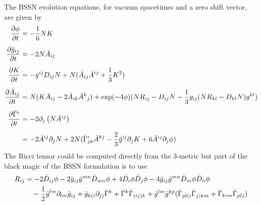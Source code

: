 \documentclass[a4paper,12pt]{article}
\numberwithin{equation}{section}%
\begin{document}
The BSSN evolution equations, for vacuum spacetimes and a zero shift vector, are given by
\begin{align}
   \ddt{\phi} &= -\frac{1}{6} N \trK\label{eqn:bssn01}\\[5pt]       %
%
   \ddt{\gBar_{ij}} &= -2 N \ABar_{i j}\label{eqn:bssn02}\\[5pt]    %
%
   \ddt{\trK} &= - g^{i j} D_{i j}{N}
                 + N (\ABar_{i j} \ABar^{i j} + \frac{1}{3} \trK^2)\label{eqn:bssn03}\\[5pt]     %
   \ddt{\ABar_{ij}} &= N (\trK \ABar_{i j} - 2 \ABar_{i k} \ABar^{k}{}_{j})
                       + \exp(-4\phi) (N R_{i j} - D_{i j}{N}
                                       - \frac{1}{3} g_{i j} (N R_{k l}
                                                              - D_{k l}{N}) g^{k l})
                                                                   \label{eqn:bssn04}\\[5pt]
   \ddt{\GammaBar^i} &= - 2 \partial_{j}\left(N \ABar^{i j}\right)\label{eqn:bssn05}\\[5pt]      %
                     &= - 2 \ABar^{i j} \partial_{j}{N}
                        + 2 N (  \GammaBar^{i}_{j k} \ABar^{k j}
                               - \frac{2}{3} \gBar^{i j} \partial_{j}{\trK}
                               + 6 \ABar^{i j} \partial_{j}{\phi})\label{eqn:bssn06}             %
\end{align}
The Ricci tensor could be computed directly from the 3-metric but part of the black magic of
the BSSN formulation is to use
\begin{align}
   R_{ij} &= - 2 {\bar{D}}_{i j}{\phi}
             - 2 {\bar{g}}_{i j} {\bar{g}}^{m n} {\bar{D}}_{m n}{\phi}
             + 4 {\bar{D}}_{i}{\phi} {\bar{D}}_{j}{\phi}
             - 4 {\bar{g}}_{i j} {\bar{g}}^{m n} {\bar{D}}_{m}{\phi} {\bar{D}}_{n}{\phi}\notag\\
             &\quad
             - \frac{1}{2} {\bar{g}}^{l m} \partial_{l m}{{\bar{g}}_{i j}}
             + {\bar{g}}_{k (i} \partial_{j)}{{\bar{\Gamma}}^{k}}
             + {\bar{\Gamma}}^{k} {\bar{\Gamma}}_{(i j) k}
             + {\bar{g}}^{l m} {\bar{g}}^{k p} (  {\bar{\Gamma}}_{p l (i} {\bar{\Gamma}}_{j) k m}
                                        + {\bar{\Gamma}}_{k i m}  {\bar{\Gamma}}_{p l j})
                                                                           \label{eqn:bssn07}
\end{align}
\end{document}
